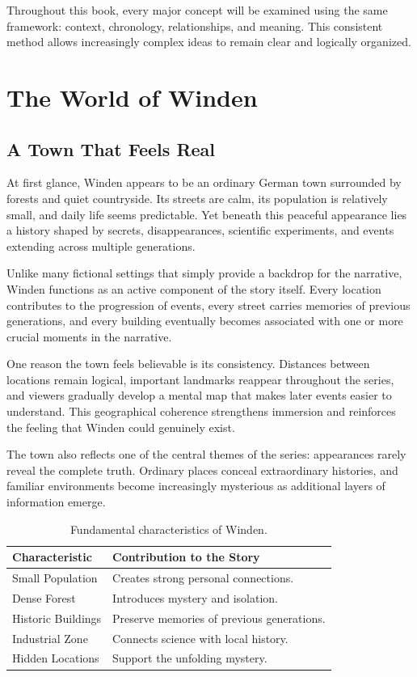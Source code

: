 \documentclass[12pt,oneside,openany]{book}
\begin{document}
\begin{tcolorbox}[colback=cyan!6,colframe=cyan!60!black,title=Analytical Principle]
Throughout this book, every major concept will be examined using the same
framework: context, chronology, relationships, and meaning. This consistent
method allows increasingly complex ideas to remain clear and logically
organized.
\end{tcolorbox}

\chapter{The World of Winden}
\section{A Town That Feels Real}

At first glance, Winden appears to be an ordinary German town surrounded by forests and quiet countryside. Its streets are calm, its population is relatively small, and daily life seems predictable. Yet beneath this peaceful appearance lies a history shaped by secrets, disappearances, scientific experiments, and events extending across multiple generations.

Unlike many fictional settings that simply provide a backdrop for the narrative, Winden functions as an active component of the story itself. Every location contributes to the progression of events, every street carries memories of previous generations, and every building eventually becomes associated with one or more crucial moments in the narrative.

One reason the town feels believable is its consistency. Distances between locations remain logical, important landmarks reappear throughout the series, and viewers gradually develop a mental map that makes later events easier to understand. This geographical coherence strengthens immersion and reinforces the feeling that Winden could genuinely exist.

The town also reflects one of the central themes of the series: appearances rarely reveal the complete truth. Ordinary places conceal extraordinary histories, and familiar environments become increasingly mysterious as additional layers of information emerge.

\begin{table}[H]
\centering
\begin{tabular}{|p{4cm}|p{8cm}|}
\hline
\textbf{Characteristic} & \textbf{Contribution to the Story} \\
\hline
Small Population & Creates strong personal connections.\\
\hline
Dense Forest & Introduces mystery and isolation.\\
\hline
Historic Buildings & Preserve memories of previous generations.\\
\hline
Industrial Zone & Connects science with local history.\\
\hline
Hidden Locations & Support the unfolding mystery.\\
\hline
\end{tabular}
\caption{Fundamental characteristics of Winden.}
\end{table}
\end{document}
